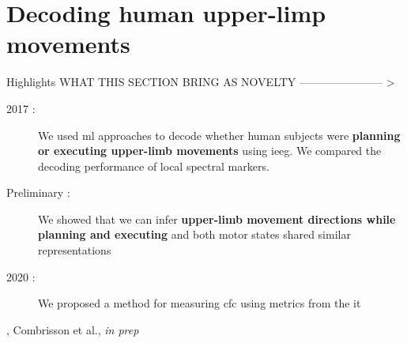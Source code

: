 \documentclass[a4paper,11pt]{article}
\begin{document}


\section{Decoding human upper-limp movements}

\begin{highlights}{Highlights}
    WHAT THIS SECTION BRING AS NOVELTY ----------------------- >
    \begin{description}
        \item[2017 :] We used \ac{ml} approaches to decode whether human subjects were \textbf{planning or executing upper-limb movements} using \ac{ieeg}. We compared the decoding performance of local spectral markers.
        \item[Preliminary :] We showed that we can infer \textbf{upper-limb movement directions while planning and executing} and both motor states shared similar representations
        \item[2020 :] We proposed a method for measuring \ac{cfc} using metrics from the \ac{it}
    \end{description}
\tcblower
\cite{combrisson2017intentions,combrisson2020tensorpac}, Combrisson et al., \textit{in prep}
\end{highlights}
\end{document}
